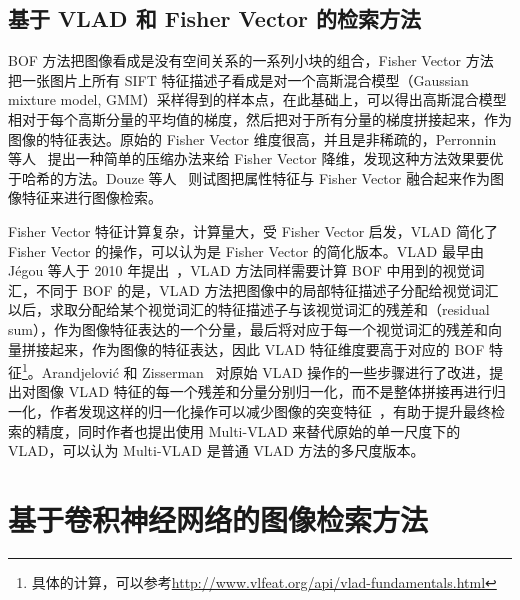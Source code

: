 \subsection{基于 VLAD 和 Fisher Vector 的检索方法}
BOF 方法把图像看成是没有空间关系的一系列小块的组合，Fisher Vector 方法~\cite{Perronnin2007FisherKO} 把一张图片上所有 SIFT 特征描述子看成是对一个高斯混合模型（Gaussian mixture model, GMM）采样得到的样本点，在此基础上，可以得出高斯混合模型相对于每个高斯分量的平均值的梯度，然后把对于所有分量的梯度拼接起来，作为图像的特征表达。原始的 Fisher Vector 维度很高，并且是非稀疏的，Perronnin 等人~\cite{Perronnin2010LargescaleIR} 提出一种简单的压缩办法来给 Fisher Vector 降维，发现这种方法效果要优于哈希的方法。Douze 等人~\cite{Douze2011CombiningAA} 则试图把属性特征与 Fisher Vector 融合起来作为图像特征来进行图像检索。

Fisher Vector 特征计算复杂，计算量大，受 Fisher Vector 启发，VLAD 简化了 Fisher Vector 的操作，可以认为是 Fisher Vector 的简化版本。VLAD 最早由 J{\'e}gou 等人于 2010 年提出~\cite{Jgou2010AggregatingLD}，VLAD 方法同样需要计算 BOF 中用到的视觉词汇，不同于 BOF 的是，VLAD 方法把图像中的局部特征描述子分配给视觉词汇以后，求取分配给某个视觉词汇的特征描述子与该视觉词汇的残差和（residual sum），作为图像特征表达的一个分量，最后将对应于每一个视觉词汇的残差和向量拼接起来，作为图像的特征表达，因此 VLAD 特征维度要高于对应的 BOF 特征\footnote{具体的计算，可以参考\url{http://www.vlfeat.org/api/vlad-fundamentals.html}}。Arandjelovi{\'c} 和 Zisserman~\cite{Arandjelovic2013AllAV} 对原始 VLAD 操作的一些步骤进行了改进，提出对图像 VLAD 特征的每一个残差和分量分别归一化，而不是整体拼接再进行归一化，作者发现这样的归一化操作可以减少图像的突变特征~\cite{Jgou2009OnTB}，有助于提升最终检索的精度，同时作者也提出使用 Multi-VLAD 来替代原始的单一尺度下的 VLAD，可以认为 Multi-VLAD 是普通 VLAD 方法的多尺度版本。

\section{基于卷积神经网络的图像检索方法}\label{sec:review_cnn_image_retrieval}
